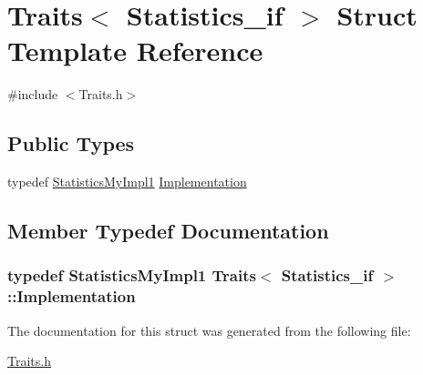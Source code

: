 \hypertarget{struct_traits_3_01_statistics__if_01_4}{\section{Traits$<$ Statistics\-\_\-if $>$ Struct Template Reference}
\label{struct_traits_3_01_statistics__if_01_4}
}


{\ttfamily \#include $<$Traits.\-h$>$}

\subsection*{Public Types}
\begin{DoxyCompactItemize}
\item 
typedef \hyperlink{class_statistics_my_impl1}{Statistics\-My\-Impl1} \hyperlink{struct_traits_3_01_statistics__if_01_4_aa783d604a6a3ee386790463a4ccc3b94}{Implementation}
\end{DoxyCompactItemize}


\subsection{Member Typedef Documentation}
\hypertarget{struct_traits_3_01_statistics__if_01_4_aa783d604a6a3ee386790463a4ccc3b94}{
\subsubsection[{Implementation}]{\setlength{\rightskip}{0pt plus 5cm}typedef {\bf Statistics\-My\-Impl1} {\bf Traits}$<$ {\bf Statistics\-\_\-if} $>$\-::{\bf Implementation}}}\label{struct_traits_3_01_statistics__if_01_4_aa783d604a6a3ee386790463a4ccc3b94}


The documentation for this struct was generated from the following file\-:\begin{DoxyCompactItemize}
\item 
\hyperlink{_traits_8h}{Traits.\-h}\end{DoxyCompactItemize}
